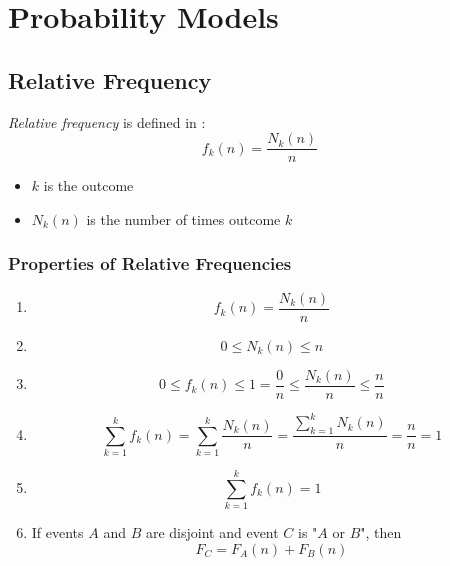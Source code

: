 \section{Probability Models} \label{sec:Probability Models}
	\subsection{Relative Frequency} \label{subsec:Relative Frequency}
		\begin{definition} \label{def:Relative Frequency}
			\emph{Relative frequency} is defined in :
			\begin{equation} \label{eq:Relative Frequency}
				f_k (n) = \frac{N_k (n)}{n}
			\end{equation}
			\begin{itemize}[noitemsep, nolistsep]
				\item $k$ is the outcome
				\item $N_k (n)$ is the number of times outcome $k$
			\end{itemize}
		\end{definition}
	
		\subsubsection{Properties of Relative Frequencies} \label{subsec:Properties Relative Frequency}
		\begin{enumerate}[label=\textbf{(\roman*)}, noitemsep, nolistsep]
			\item 
				\begin{equation}
					f_k (n) = \frac{N_k (n)}{n}
				\end{equation}
			\item
				\begin{equation}
					0 \leq N_k (n) \leq n
				\end{equation}
			\item
				\begin{equation}
					0 \leq f_k (n) \leq 1 = \frac{0}{n} \leq \frac{N_k (n)}{n} \leq \frac{n}{n}
				\end{equation}
			\item
				\begin{equation}
					\sum\limits_{k=1}^{k} f_k (n) = \sum\limits_{k=1}^{k} \frac{N_k (n)}{n} = \frac{\sum\limits_{k=1}^{k} N_k (n)}{n} = \frac{n}{n} = 1
				\end{equation}
			\item
				\begin{equation}
					\sum\limits_{k=1}^{k} f_k (n) = 1
				\end{equation}
			\item If events $A$ and $B$ are disjoint and event $C$ is "$A$ or $B$", then 
				\begin{equation}
					F_C = F_A (n) + F_B (n)
				\end{equation}
		\end{enumerate}
